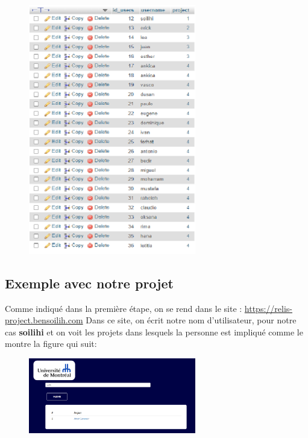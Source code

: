 \begin{figure}[H]
        \centering
        \includegraphics[width=0.65\textwidth]{resources/images/users.PNG}
\end{figure}

\newpage

\subsection{Exemple avec notre projet}

Comme indiqué dans la première étape, on se rend dans le site : \href{https://relis-project.bensoilih.com}{https://relis-project.bensoilih.com} 
\vspace*{2mm}
Dans ce site, on écrit notre nom d'utilisateur, pour notre cas \textbf{soilihi} et on voit les projets dans lesquels la personne
est impliqué comme le montre la figure qui suit:

\begin{figure}[H]
        \centering
        \includegraphics[width=0.65\textwidth]{resources/images/exemple1.PNG}
\end{figure}

